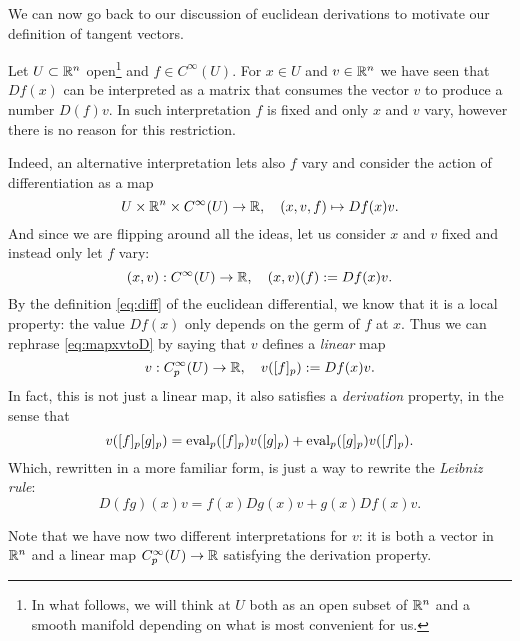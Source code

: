 We can now go back to our discussion of euclidean derivations to motivate our definition of tangent vectors.

\begin{example}\label{ex:euclideanD}
  Let $U\subset\mathbb{R}^n$ open\footnote{In what follows, we will think at $U$ both as an open subset of $\mathbb{R}^n$ and a smooth manifold depending on what is most convenient for us.} and $f\in C^\infty(U)$.
  For $x\in U$ and $v\in\mathbb{R}^n$ we have seen that $Df(x)$ can be interpreted as a matrix that consumes the vector $v$ to produce a number $D(f)v$.
  In such interpretation $f$ is fixed and only $x$ and $v$ vary, however there is no reason for this restriction.

  Indeed, an alternative interpretation lets also $f$ vary and consider the action of differentiation as a map
  \begin{equation}
    U \times \mathbb{R}^n \times C^\infty(U) \to \mathbb{R},\quad
    (x,v,f) \mapsto Df(x) v.
  \end{equation}
  And since we are flipping around all the ideas, let us consider $x$ and $v$ fixed and instead only let $f$ vary:
  \begin{equation}\label{eq:mapxvtoD}
    (x,v):C^\infty(U) \to\mathbb{R}, \quad (x,v)(f) := Df(x)v.
  \end{equation}
  By the definition \eqref{eq:diff} of the euclidean differential, we know that it is a local property: the value $Df(x)$ only depends on the germ of $f$ at $x$.
  Thus we can rephrase \eqref{eq:mapxvtoD} by saying that $v$ defines a \emph{linear} map
  \begin{equation}
    v : C_p^\infty(U) \to \mathbb{R}, \quad
    v([f]_p) := Df(x) v.
  \end{equation}
  In fact, this is not just a linear map, it also satisfies a \emph{derivation} property, in the sense that
  \begin{equation}
    v([f]_p [g]_p) =
      \operatorname{eval}_p([f]_p)v([g]_p)
      + \operatorname{eval}_p([g]_p)v([f]_p).
  \end{equation}
  Which, rewritten in a more familiar form, is just a way to rewrite the \emph{Leibniz rule}:
  \begin{equation}
    D(fg)(x) v = f(x)Dg(x)v + g(x) Df(x)v.
  \end{equation}

  Note that we have now two different interpretations for $v$: it is both a vector in $\mathbb{R}^n$ and a linear map $C_p^\infty(U) \to \mathbb{R}$ satisfying the derivation property.
\end{example}

